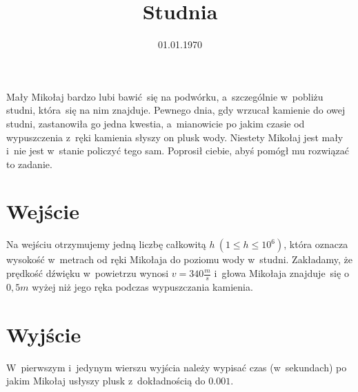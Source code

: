 \documentclass[zad]{soigstyl}
\date{01.01.1970}
\title{\mbox{Studnia}}
\begin{document}
\begin{tasktext}%
    \noindent
    Mały Mikołaj bardzo lubi bawić~się na podwórku, a~szczególnie w~pobliżu studni, która~się na nim znajduje. Pewnego dnia, gdy wrzucał kamienie do owej studni, zastanowiła go jedna kwestia, a~mianowicie po jakim czasie od wypuszczenia z~ręki kamienia słyszy on plusk wody. Niestety Mikołaj jest mały i~nie jest w~stanie policzyć tego sam. Poprosił ciebie, abyś pomógł mu rozwiązać to zadanie.
	
    	\section{Wejście}
	Na wejściu otrzymujemy jedną liczbę całkowitą $h~(1 \leqslant h \leqslant 10^6)$, która oznacza wysokość w~metrach od ręki Mikołaja do poziomu wody w~studni. Zakładamy, że prędkość dźwięku w~powietrzu wynosi $v=340\frac{m}{s}$ i~głowa Mikołaja znajduje~się o~$0,5 m$ wyżej niż jego ręka podczas wypuszczania kamienia.
	
	\section{Wyjście}
	W~pierwszym i~jedynym wierszu wyjścia należy wypisać czas (w~sekundach) po jakim Mikołaj usłyszy plusk z~dokładnością do $0.001$.
	
	\oigprzyklady
\end{tasktext}
\end{document}
